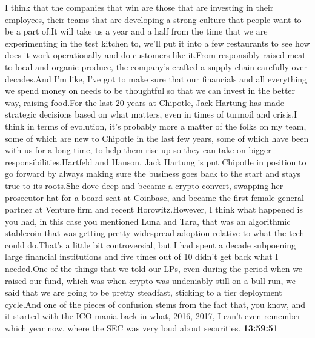 \documentclass{article}%
\begin{document}
I think that the companies that win are those that are investing in their employees, their teams that are developing a strong culture that people want to be a part of.It will take us a year and a half from the time that we are experimenting in the test kitchen to, we'll put it into a few restaurants to see how does it work operationally and do customers like it.From responsibly raised meat to local and organic produce, the company's crafted a supply chain carefully over decades.And I'm like, I've got to make sure that our financials and all everything we spend money on needs to be thoughtful so that we can invest in the better way, raising food.For the last 20 years at Chipotle, Jack Hartung has made strategic decisions based on what matters, even in times of turmoil and crisis.I think in terms of evolution, it's probably more a matter of the folks on my team, some of which are new to Chipotle in the last few years, some of which have been with us for a long time, to help them rise up so they can take on bigger responsibilities.Hartfeld and Hanson, Jack Hartung is put Chipotle in position to go forward by always making sure the business goes back to the start and stays true to its roots.She dove deep and became a crypto convert, swapping her prosecutor hat for a board seat at Coinbase, and became the first female general partner at Venture firm and recent Horowitz.However, I think what happened is you had, in this case you mentioned Luna and Tara, that was an algorithmic stablecoin that was getting pretty widespread adoption relative to what the tech could do.That's a little bit controversial, but I had spent a decade subpoening large financial institutions and five times out of 10 didn't get back what I needed.One of the things that we told our LPs, even during the period when we raised our fund, which was when crypto was undeniably still on a bull run, we said that we are going to be pretty steadfast, sticking to a tier deployment cycle.And one of the pieces of confusion stems from the fact that, you know, and it started with the ICO mania back in what, 2016, 2017, I can't even remember which year now, where the SEC was very loud about securities.%
\textbf{13:59:51}%
\end{document}
